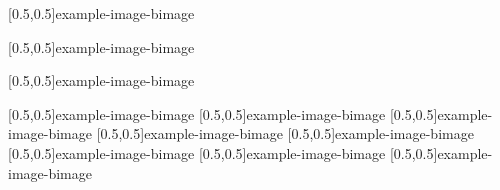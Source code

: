 



\graphicspath{{Figures/}{Figures/Iceland}}


\subtitle{Day 1}
\date{07.10.2019}


    
    
    [0.5,0.5]{example-image-b}{image}
    
    [0.5,0.5]{example-image-b}{image}
    
    [0.5,0.5]{example-image-b}{image}
    
    [0.5,0.5]{example-image-b}{image}
%     
    [0.5,0.5]{example-image-b}{image}
%     
    [0.5,0.5]{example-image-b}{image}
%     
    [0.5,0.5]{example-image-b}{image}
%     
    [0.5,0.5]{example-image-b}{image}
%     
    [0.5,0.5]{example-image-b}{image}
%     
    [0.5,0.5]{example-image-b}{image}
%     
    [0.5,0.5]{example-image-b}{image}

